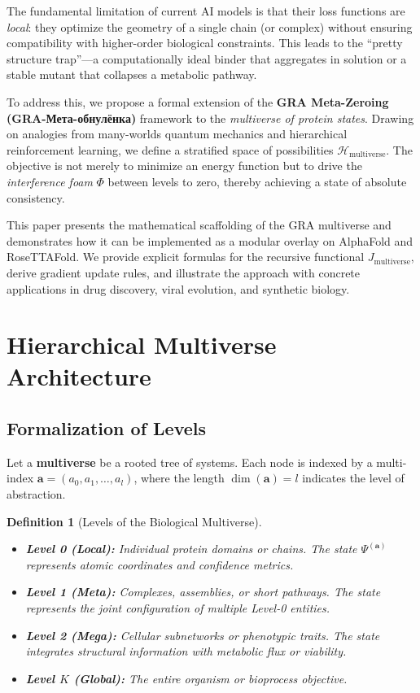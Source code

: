 \documentclass[11pt]{article}
\newtheorem{definition}[theorem]{Definition}
\newcommand{\cH}{\mathcal{H}}
\begin{document}
The fundamental limitation of current AI models is that their loss functions are \emph{local}: they optimize the geometry of a single chain (or complex) without ensuring compatibility with higher-order biological constraints. This leads to the ``pretty structure trap''---a computationally ideal binder that aggregates in solution or a stable mutant that collapses a metabolic pathway.

To address this, we propose a formal extension of the \textbf{GRA Meta-Zeroing (GRA-Мета-обнулёнка)} framework to the \emph{multiverse of protein states}. Drawing on analogies from many-worlds quantum mechanics and hierarchical reinforcement learning, we define a stratified space of possibilities \(\cH_{\text{multiverse}}\). The objective is not merely to minimize an energy function but to drive the \emph{interference foam} \(\Phi\) between levels to zero, thereby achieving a state of absolute consistency.

This paper presents the mathematical scaffolding of the GRA multiverse and demonstrates how it can be implemented as a modular overlay on AlphaFold and RoseTTAFold. We provide explicit formulas for the recursive functional \(J_{\text{multiverse}}\), derive gradient update rules, and illustrate the approach with concrete applications in drug discovery, viral evolution, and synthetic biology.

\section{Hierarchical Multiverse Architecture}

\subsection{Formalization of Levels}

Let a \textbf{multiverse} be a rooted tree of systems. Each node is indexed by a multi-index \(\mathbf{a} = (a_0, a_1, \dots, a_l)\), where the length \(\dim(\mathbf{a}) = l\) indicates the level of abstraction.

\begin{definition}[Levels of the Biological Multiverse]
\begin{itemize}[leftmargin=*]
    \item \textbf{Level 0 (Local):} Individual protein domains or chains. The state \(\Psi^{(\mathbf{a})}\) represents atomic coordinates and confidence metrics.
    \item \textbf{Level 1 (Meta):} Complexes, assemblies, or short pathways. The state represents the joint configuration of multiple Level-0 entities.
    \item \textbf{Level 2 (Mega):} Cellular subnetworks or phenotypic traits. The state integrates structural information with metabolic flux or viability.
    \item \textbf{Level \(K\) (Global):} The entire organism or bioprocess objective.
\end{itemize}
\end{definition}
\end{document}
